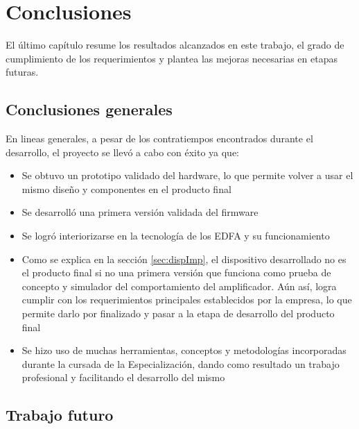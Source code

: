 
\chapter{Conclusiones} %

\label{Chapter5} %



El último capítulo resume los resultados alcanzados en este trabajo, el grado de cumplimiento de los requerimientos y plantea las mejoras necesarias en etapas futuras.

\section{Conclusiones generales}

En lineas generales, a pesar de los contratiempos encontrados durante el desarrollo, el proyecto se llevó a cabo con éxito ya que:  

\begin{itemize}
\item Se obtuvo un prototipo validado del hardware, lo que permite volver a usar el mismo diseño y componentes en el producto final
\item Se desarrolló una primera versión validada del firmware 
\item Se logró interiorizarse en la tecnología de los EDFA y su funcionamiento
\item Como se explica en la sección \ref{sec:dispImp}, el dispositivo desarrollado no es el producto final si no una primera versión que funciona como prueba de concepto y simulador del comportamiento del amplificador. Aún así, logra cumplir con los requerimientos principales establecidos por la empresa, lo que permite darlo por finalizado y pasar a la etapa de desarrollo del producto final
\item Se hizo uso de muchas herramientas, conceptos y metodologías incorporadas durante la cursada de la 	Especialización, dando como resultado un trabajo profesional y facilitando el desarrollo del mismo
\end{itemize}

\section{Trabajo futuro}

